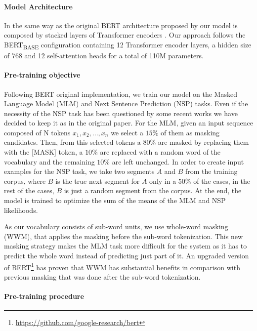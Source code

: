 \documentclass[10pt, a4paper]{article}
\begin{document}
\paragraph{Model Architecture}

In the same way as the original BERT architecture proposed by  our model is composed by stacked layers of Transformer encoders \cite{vaswani2017attention}. Our approach follows the BERT\textsubscript{BASE} configuration containing 12 Transformer encoder layers, a hidden size of 768 and 12 self-attention heads for a total of 110M parameters. 

\paragraph{Pre-training objective}

Following BERT original implementation, we train our model on the Masked Language Model (MLM) and Next Sentence Prediction (NSP) tasks. Even if the necessity of the NSP task has been questioned by some recent works \cite{yang2019xlnet,liu2019roberta,lample2019cross} we have decided to keep it as in the original paper. For the MLM, given an input sequence composed of N tokens $x_1, x_2, ..., x_n$ we select a $15\%$ of them as masking candidates. Then, from this selected tokens a $80\%$ are masked by replacing them with the [MASK] token, a $10\%$ are replaced with a random word of the vocabulary and the remaining $10\%$ are left unchanged. In order to create input examples for the NSP task, we take two segments $A$ and $B$ from the training corpus, where $B$ is the true next segment for $A$ only in a $50\%$ of the cases, in the rest of the cases, $B$ is just a random segment from the corpus. At the end, the model is trained to optimize the sum of the means of the MLM and NSP likelihoods.

As our vocabulary consists of sub-word units, we use whole-word masking (WWM), that applies the masking before the sub-word tokenization. This new masking strategy makes the MLM task more difficult for the system as it has to predict the whole word instead of predicting just part of it. An upgraded version of BERT\footnote{\url{https://github.com/google-research/bert}} has proven that WWM has substantial benefits in comparison with previous masking that was done after the sub-word tokenization. 

\paragraph{Pre-training procedure}
\end{document}
